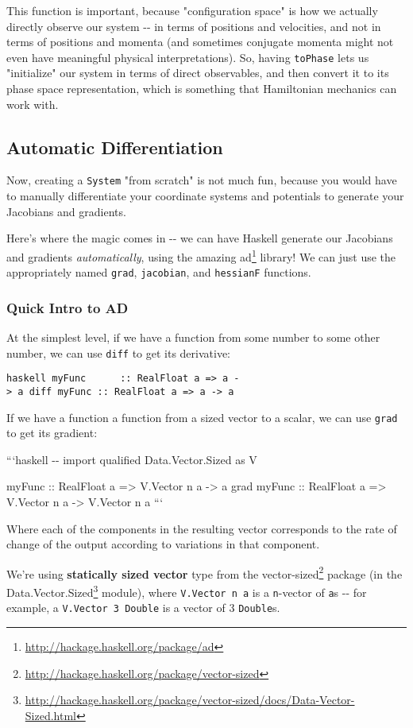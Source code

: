 \documentclass[]{article}
\renewcommand{\href}[2]{#2\footnote{\url{#1}}}
\begin{document}
This function is important, because "configuration space" is how we actually
directly observe our system -\/- in terms of positions and velocities, and not
in terms of positions and momenta (and sometimes conjugate momenta might not
even have meaningful physical interpretations). So, having \texttt{toPhase} lets
us "initialize" our system in terms of direct observables, and then convert it
to its phase space representation, which is something that Hamiltonian mechanics
can work with.

\subsection{Automatic Differentiation}

Now, creating a \texttt{System} "from scratch" is not much fun, because you
would have to manually differentiate your coordinate systems and potentials to
generate your Jacobians and gradients.

Here's where the magic comes in -\/- we can have Haskell generate our Jacobians
and gradients \emph{automatically}, using the amazing
\href{http://hackage.haskell.org/package/ad}{ad} library! We can just use the
appropriately named \texttt{grad}, \texttt{jacobian}, and \texttt{hessianF}
functions.

\subsubsection{Quick Intro to AD}

At the simplest level, if we have a function from some number to some other
number, we can use \texttt{diff} to get its derivative:

\texttt{haskell\ myFunc\ \ \ \ \ \ ::\ RealFloat\ a\ =\textgreater{}\ a\ -\textgreater{}\ a\ diff\ myFunc\ ::\ RealFloat\ a\ =\textgreater{}\ a\ -\textgreater{}\ a}

If we have a function a function from a sized vector to a scalar, we can use
\texttt{grad} to get its gradient:

```haskell -\/- import qualified Data.Vector.Sized as V

myFunc :: RealFloat a =\textgreater{} V.Vector n a -\textgreater{} a grad myFunc
:: RealFloat a =\textgreater{} V.Vector n a -\textgreater{} V.Vector n a ```

Where each of the components in the resulting vector corresponds to the rate of
change of the output according to variations in that component.

We're using \textbf{statically sized vector} type from the
\href{http://hackage.haskell.org/package/vector-sized}{vector-sized} package (in
the
\href{http://hackage.haskell.org/package/vector-sized/docs/Data-Vector-Sized.html}{Data.Vector.Sized}
module), where \texttt{V.Vector\ n\ a} is a \texttt{n}-vector of \texttt{a}s
-\/- for example, a \texttt{V.Vector\ 3\ Double} is a vector of 3
\texttt{Double}s.
\end{document}
